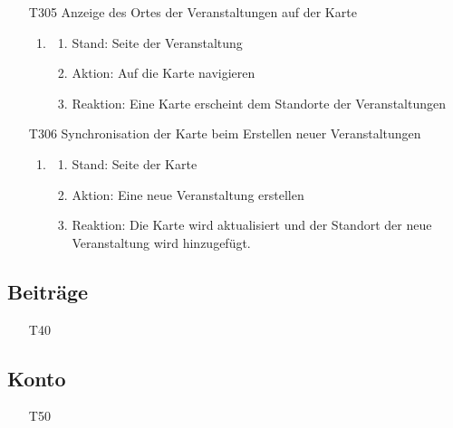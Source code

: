 \documentclass[parskip=full]{scrartcl}
\begin{document}
\begin{itemize}
			\item[T305] Anzeige des Ortes der Veranstaltungen auf der Karte
			\begin{enumerate}
				\item
				
				\begin{enumerate}[nosep]
					\item Stand: Seite der Veranstaltung
					\item Aktion: Auf die Karte navigieren
					\item Reaktion: Eine Karte erscheint dem Standorte der Veranstaltungen
					
				\end{enumerate}
			\end{enumerate}
			
			\item[T306] Synchronisation der Karte beim Erstellen neuer Veranstaltungen
			\begin{enumerate}
				\item
				
				\begin{enumerate}[nosep]
					\item Stand: Seite der Karte
					\item Aktion: Eine neue Veranstaltung erstellen
					\item Reaktion: Die Karte wird aktualisiert und der Standort der neue Veranstaltung wird  hinzugefügt.
					
				\end{enumerate}
			\end{enumerate}
		
		\end{itemize}
	
	
	
	\subsection{Beiträge}
	
		\begin{itemize}
			\item[T40] 
		\end{itemize}


	\subsection{Konto}
		
		\begin{itemize}
			\item[T50] 
		\end{itemize}
	
\end{document}
